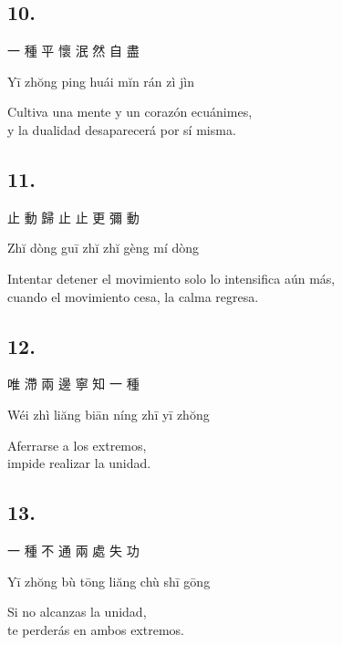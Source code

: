 \documentclass[
  a5paperpaper,
]{article}
\begin{document}
\begin{verseblock}

\hypertarget{section-84}{%
\subsection{10.}\label{section-84}}

一 種 平 懷 泯 然 自 盡

Yī zhŏng ping huái mĭn rán zì jìn

Cultiva una mente y un corazón ecuánimes,\\
y la dualidad desaparecerá por sí misma.

\end{verseblock}

\begin{verseblock}

\hypertarget{section-85}{%
\subsection{11.}\label{section-85}}

止 動 歸 止 止 更 彌 動

Zhĭ dòng guī zhĭ zhĭ gèng mí dòng

Intentar detener el movimiento solo lo intensifica aún más,\\
cuando el movimiento cesa, la calma regresa.

\end{verseblock}

\begin{verseblock}

\hypertarget{section-86}{%
\subsection{12.}\label{section-86}}

唯 滯 兩 邊 寧 知 一 種

Wéi zhì liăng biān níng zhī yī zhŏng

Aferrarse a los extremos,\\
impide realizar la unidad.

\end{verseblock}

\begin{verseblock}

\hypertarget{section-87}{%
\subsection{13.}\label{section-87}}

一 種 不 通 兩 處 失 功

Yī zhŏng bù tōng liăng chù shī gōng

Si no alcanzas la unidad,\\
te perderás en ambos extremos.

\end{verseblock}
\end{document}
